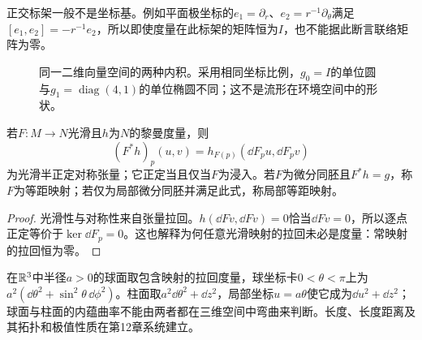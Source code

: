 正交标架一般不是坐标基。例如平面极坐标的$e_1=\partial_r$、$e_2=r^{-1}\partial_\theta$满足$[e_1,e_2]=-r^{-1}e_2$，所以即使度量在此标架的矩阵恒为$I$，也不能据此断言联络矩阵为零。

\begin{figure}[htbp]
\centering
\caption{同一二维向量空间的两种内积。采用相同坐标比例，$g_0=I$的单位圆与$g_1=\operatorname{diag}(4,1)$的单位椭圆不同；这不是流形在环境空间中的形状。}
\label{fig:metric-unit-balls}
\end{figure}

\begin{proposition}[拉回度量]\label{prop:pullback-metric}
若$F:M\to N$光滑且$h$为$N$的黎曼度量，则
\[
 (F^*h)_p(u,v)=h_{F(p)}(\dd F_pu,\dd F_pv)
\]
为光滑半正定对称张量；它正定当且仅当$F$为浸入。若$F$为微分同胚且$F^*h=g$，称$F$为等距映射；若仅为局部微分同胚并满足此式，称局部等距映射。
\end{proposition}
\begin{proof}
光滑性与对称性来自张量拉回。$h(\dd Fv,\dd Fv)=0$恰当$\dd Fv=0$，所以逐点正定等价于$\ker\dd F_p=0$。这也解释为何任意光滑映射的拉回未必是度量：常映射的拉回恒为零。
\end{proof}

在$\mathbb{R}^3$中半径$a>0$的球面取包含映射的拉回度量，球坐标卡$0<\theta<\pi$上为$a^2(\dd\theta^2+\sin^2\theta\,\dd\phi^2)$。柱面取$a^2\dd\theta^2+\dd z^2$，局部坐标$u=a\theta$使它成为$\dd u^2+\dd z^2$；球面与柱面的内蕴曲率不能由两者都在三维空间中弯曲来判断。长度、长度距离及其拓扑和极值性质在第12章系统建立。
